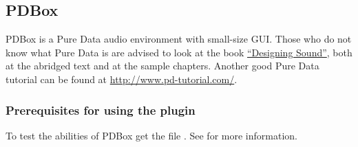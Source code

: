 \subsection{PDBox}

PDBox is a Pure Data audio environment with small-size GUI. Those who do not know
what Pure Data is are advised to look at the book \href{http://aspress.co.uk/ds/}
{``Designing Sound''}, both at the abridged text and at the sample chapters.
Another good Pure Data tutorial can be found at \url{http://www.pd-tutorial.com/}.

\subsubsection{Prerequisites for using the plugin}
To test the abilities of PDBox get the file 
\href{http://www.rockbox.org/wiki/pub/Main/PureDataOnRockbox/PureData.zip}
{}. See  for more information.
